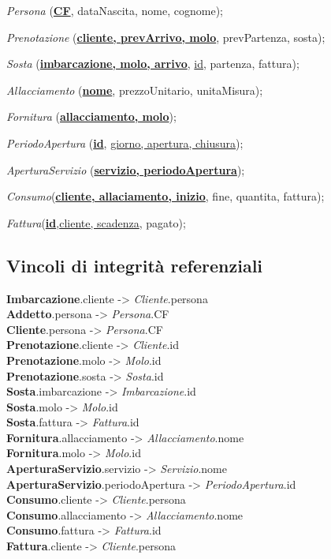 \textit{Persona} (\underline{\textbf{CF}}, dataNascita, nome, cognome);

\textit{Prenotazione} (\underline{\textbf{cliente, prevArrivo, molo}}, prevPartenza, sosta);

\textit{Sosta} (\underline{\textbf{imbarcazione, molo, arrivo}}, \underline{id}, partenza, fattura);

\textit{Allacciamento} (\underline{\textbf{nome}}, prezzoUnitario, unitaMisura);

\textit{Fornitura} (\underline{\textbf{allacciamento, molo}});

\textit{PeriodoApertura} (\underline{\textbf{id}}, \underline{giorno, apertura, chiusura});

\textit{AperturaServizio} (\underline{\textbf{servizio, periodoApertura}});

\textit{Consumo}(\underline{\textbf{cliente, allaciamento, inizio}}, fine, quantita, fattura);

\textit{Fattura}(\underline{\textbf{id}},\underline{cliente, scadenza}, pagato);\\

\subsection{Vincoli di integrità referenziali}

\textbf{Imbarcazione}.cliente -> \textit{Cliente}.persona\\
\textbf{Addetto}.persona -> \textit{Persona}.CF\\
\textbf{Cliente}.persona -> \textit{Persona}.CF\\
\textbf{Prenotazione}.cliente -> \textit{Cliente}.id\\
\textbf{Prenotazione}.molo -> \textit{Molo}.id\\
\textbf{Prenotazione}.sosta -> \textit{Sosta}.id\\
\textbf{Sosta}.imbarcazione -> \textit{Imbarcazione}.id\\
\textbf{Sosta}.molo -> \textit{Molo}.id\\
\textbf{Sosta}.fattura -> \textit{Fattura}.id\\
\textbf{Fornitura}.allacciamento -> \textit{Allacciamento}.nome\\
\textbf{Fornitura}.molo -> \textit{Molo}.id\\
\textbf{AperturaServizio}.servizio -> \textit{Servizio}.nome\\
\textbf{AperturaServizio}.periodoApertura -> \textit{PeriodoApertura}.id\\
\textbf{Consumo}.cliente -> \textit{Cliente}.persona\\
\textbf{Consumo}.allacciamento -> \textit{Allacciamento}.nome\\
\textbf{Consumo}.fattura -> \textit{Fattura}.id\\
\textbf{Fattura}.cliente -> \textit{Cliente}.persona\\

